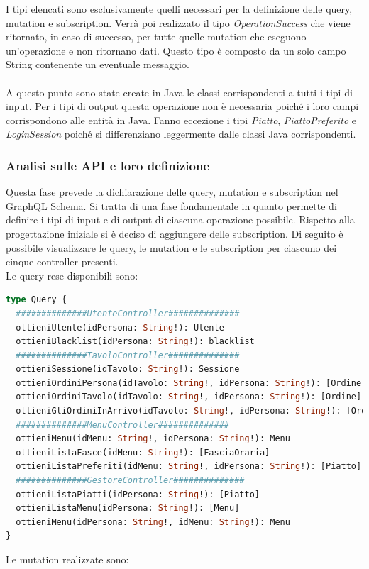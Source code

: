 I tipi elencati sono esclusivamente quelli necessari per la definizione delle query, mutation e subscription. Verrà poi realizzato il tipo \textit{OperationSuccess} che viene ritornato, in caso di successo, per tutte quelle mutation che eseguono un'operazione e non ritornano dati. Questo tipo è composto da un solo campo String contenente un eventuale messaggio.\\ \\
A questo punto sono state create in Java le classi corrispondenti a tutti i tipi di input. Per i tipi di output questa operazione non è necessaria poiché i loro campi corrispondono alle entità in Java. Fanno eccezione i tipi \textit{Piatto}, \textit{PiattoPreferito} e \textit{LoginSession} poiché si differenziano leggermente dalle classi Java corrispondenti.
\subsubsection*{Analisi sulle API e loro definizione}
Questa fase prevede la dichiarazione delle query, mutation e subscription nel GraphQL Schema. Si tratta di una fase fondamentale in quanto permette di definire i tipi di input e di output di ciascuna operazione possibile. Rispetto alla progettazione iniziale si è deciso di aggiungere delle subscription. Di seguito è possibile visualizzare le query, le mutation e le subscription per ciascuno dei cinque controller presenti.\\
Le query rese disponibili sono:
\begin{lstlisting}[language=GraphQL]
type Query {
  ##############UtenteController##############
  ottieniUtente(idPersona: String!): Utente
  ottieniBlacklist(idPersona: String!): blacklist
  ##############TavoloController##############
  ottieniSessione(idTavolo: String!): Sessione
  ottieniOrdiniPersona(idTavolo: String!, idPersona: String!): [Ordine]
  ottieniOrdiniTavolo(idTavolo: String!, idPersona: String!): [Ordine]
  ottieniGliOrdiniInArrivo(idTavolo: String!, idPersona: String!): [Ordine]
  ##############MenuController##############
  ottieniMenu(idMenu: String!, idPersona: String!): Menu
  ottieniListaFasce(idMenu: String!): [FasciaOraria]
  ottieniListaPreferiti(idMenu: String!, idPersona: String!): [Piatto]
  ##############GestoreController##############
  ottieniListaPiatti(idPersona: String!): [Piatto]
  ottieniListaMenu(idPersona: String!): [Menu]
  ottieniMenu(idPersona: String!, idMenu: String!): Menu
}
\end{lstlisting}
Le mutation realizzate sono:
